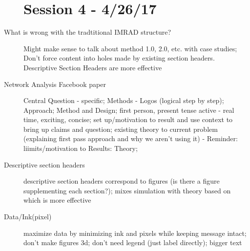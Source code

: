 \documentclass[10pt]{article}
\begin{document}
\begin{description}
\section{Session 4 - 4/26/17}
\item[What is wrong with the tradtitional IMRAD structure?]
    Might make sense to talk about method 1.0, 2.0, etc. with case studies;
    Don't force content into holes made by existing section headers.
    Descriptive Section Headers are more effective
\item[Network Analysis Facebook paper]
    Central Question - specific;
    Methods - Logos (logical step by step);
    Approach;
    Method and Design;
    first person, present tense active - real time, exciting, concise;
    set up/motivation to result and use context to bring up claims and question;
    existing theory to current problem (explaining  first pass approach and why we aren't using it)  - Reminder: liimits/motivation to Results: Theory;
\item[Descriptive section headers]
    descriptive section headers correspond to figures (is there a figure supplementing each section?);
    mixes simulation with theory based on which is more effective
\item[Data/Ink(pixel)]
    maximize data by minimizing ink and pixels while keeping message intact;
    don't make figures 3d;
    don't need legend (just label directly);
    bigger text
\end{description}
\end{document}
